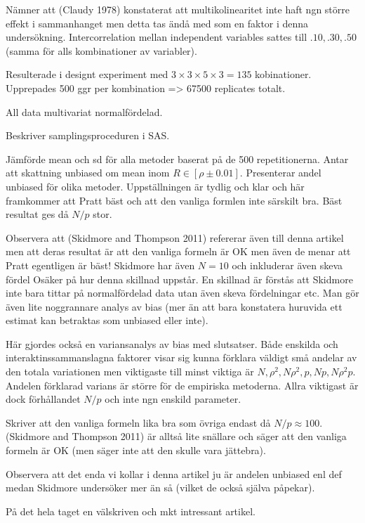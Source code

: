 \documentclass[]{article}
\begin{document}
Nämner att (Claudy 1978) konstaterat att multikolinearitet inte haft ngn
större effekt i sammanhanget men detta tas ändå med som en faktor i
denna undersökning. Intercorrelation mellan independent variables sattes
till \(.10, .30, .50\) (samma för alls kombinationer av variabler).

Resulterade i designt experiment med
\(3 \times 3 \times 5 \times 3 = 135\) kobinationer. Upprepades 500 ggr
per kombination =\textgreater{} 67500 replicates totalt.

All data multivariat normalfördelad.

Beskriver samplingsproceduren i SAS.

Jämförde mean och sd för alla metoder baserat på de 500 repetitionerna.
Antar att skattning unbiased om mean inom \(R \in [\rho \pm 0.01]\).
Presenterar andel unbiased för olika metoder. Uppställningen är tydlig
och klar och här framkommer att Pratt bäst och att den vanliga formlen
inte särskilt bra. Bäst resultat ges då \(N/p\) stor.

Observera att (Skidmore and Thompson 2011) refererar även till denna
artikel men att deras resultat är att den vanliga formeln är OK men även
de menar att Pratt egentligen är bäst! Skidmore har även \(N=10\) och
inkluderar även skeva fördel Osäker på hur denna skillnad uppstår. En
skillnad är förstås att Skidmore inte bara tittar på normalfördelad data
utan även skeva fördelningar etc. Man gör även lite noggrannare analys
av bias (mer än att bara konstatera huruvida ett estimat kan betraktas
som unbiased eller inte).

Här gjordes också en variansanalys av bias med slutsatser. Både enskilda
och interaktinssammanslagna faktorer visar sig kunna förklara väldigt
små andelar av den totala variationen men viktigaste till minst viktiga
är \(N, \rho^2, N\rho^2, p, Np, N\rho^2p\). Andelen förklarad varians är
större för de empiriska metoderna. Allra viktigast är dock förhållandet
\(N/p\) och inte ngn enskild parameter.

Skriver att den vanliga formeln lika bra som övriga endast då
\(N/p \approx 100\). (Skidmore and Thompson 2011) är alltså lite
snällare och säger att den vanliga formeln är OK (men säger inte att den
skulle vara jättebra).

Observera att det enda vi kollar i denna artikel ju är andelen unbiased
enl def medan Skidmore undersöker mer än så (vilket de också själva
påpekar).

På det hela taget en välskriven och mkt intressant artikel.
\end{document}
